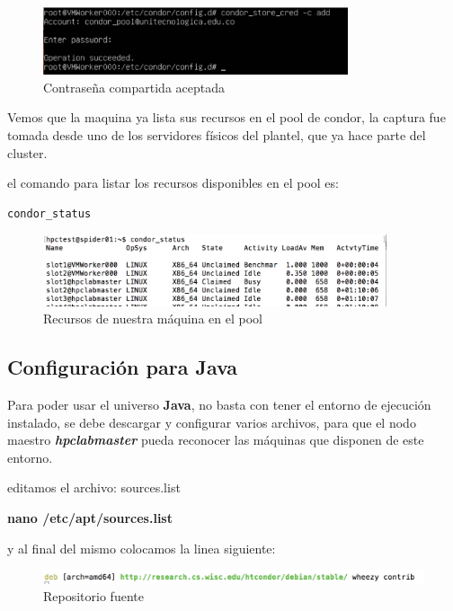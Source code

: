 \begin{figure}[h]
\centering
\includegraphics[width=0.8\textwidth]{Figures/pswrdok.png}
\decoRule
\caption{Contraseña compartida aceptada}
\label{fig:condor creed}
\end{figure}
\FloatBarrier

Vemos que la maquina ya lista sus recursos en el pool de condor, la captura fue tomada desde uno de los servidores físicos del plantel, que ya hace parte del cluster.

el comando para listar los recursos disponibles en el pool es:
\begin{lstlisting}
condor_status
\end{lstlisting}

\begin{figure}[h]
\centering
\includegraphics[width=0.9\textwidth]{Figures/vmwok.png}
\decoRule
\caption{Recursos de nuestra máquina en el pool}
\label{fig:condor creed}
\end{figure}
\FloatBarrier

\subsection{Configuración para Java}

Para poder usar el universo \textbf{Java}, no basta con tener el entorno de ejecución instalado, se debe descargar y configurar varios archivos, para que el nodo maestro \textbf{\textit{hpclabmaster}} pueda reconocer las máquinas que disponen de este entorno.

editamos el archivo: sources.list

\textbf{nano /etc/apt/sources.list}

y al final del mismo colocamos la linea siguiente:

\begin{figure}[h]
\centering
\includegraphics[width=1\textwidth]{Figures/sourceedit.png}
\decoRule
\caption{Repositorio fuente }
\label{fig:source}
\end{figure}
\FloatBarrier

